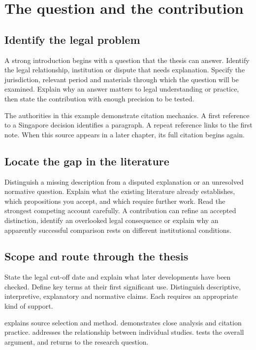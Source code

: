 \chapter{The question and the contribution}\label{ch:introduction}
\section{Identify the legal problem}
A strong introduction begins with a question that the thesis can answer.
Identify the legal relationship, institution or dispute that needs explanation.
Specify the jurisdiction, relevant period and materials through which the
question will be examined. Explain why an answer matters to legal understanding
or practice, then state the contribution with enough precision to be tested.

The authorities in this example demonstrate citation mechanics.
A first reference to a Singapore decision identifies a paragraph.
A repeat reference links to the first note.
When this source appears in a later chapter, its full citation begins again.

\section{Locate the gap in the literature}
Distinguish a missing description from a disputed explanation or an unresolved
normative question. Explain what the existing literature already establishes,
which propositions you accept, and which require further work. Read the strongest
competing account carefully. A contribution can refine an accepted distinction,
identify an overlooked legal consequence or explain why an apparently successful
comparison rests on different institutional conditions.


\section{Scope and route through the thesis}
State the legal cut-off date and explain what later developments have been
checked. Define key terms at their first significant use. Distinguish descriptive,
interpretive, explanatory and normative claims. Each requires an appropriate
kind of support.

 explains source selection and method.
 demonstrates close analysis and citation practice.
\ifLawArticles{}\else{}\fi
addresses the relationship between individual
studies.  tests the overall argument, and
 returns to the research question.
